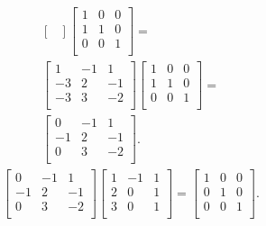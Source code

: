 \documentclass[12pt]{article}
\begin{document}
\begin{enumerate}
\begin{align*}
\begin{bmatrix}
      \end{bmatrix}
      \begin{bmatrix}
        1 &  0 & 0\\
        1 &  1 & 0\\
        0 &  0 & 1\\
      \end{bmatrix} =\\
      \begin{bmatrix}
         1 & -1 &  1\\
        -3 &  2 & -1\\
        -3 &  3 & -2\\
      \end{bmatrix}
      \begin{bmatrix}
        1 &  0 & 0\\
        1 &  1 & 0\\
        0 &  0 & 1\\
      \end{bmatrix} =\\
      \begin{bmatrix}
         0 & -1 &  1\\
        -1 &  2 & -1\\
         0 &  3 & -2\\
      \end{bmatrix}.
    \end{align*}
    \begin{align*}
      \begin{bmatrix}
         0 & -1 &  1\\
        -1 &  2 & -1\\
         0 &  3 & -2\\
      \end{bmatrix}
      \begin{bmatrix}
        1 & -1 & 1\\
        2 &  0 & 1\\
        3 &  0 & 1\\
      \end{bmatrix}
      =
      \begin{bmatrix}
        1 & 0 & 0\\
        0 & 1 & 0\\
        0 & 0 & 1\\
      \end{bmatrix}.
    \end{align*}
\end{enumerate}
\end{document}
